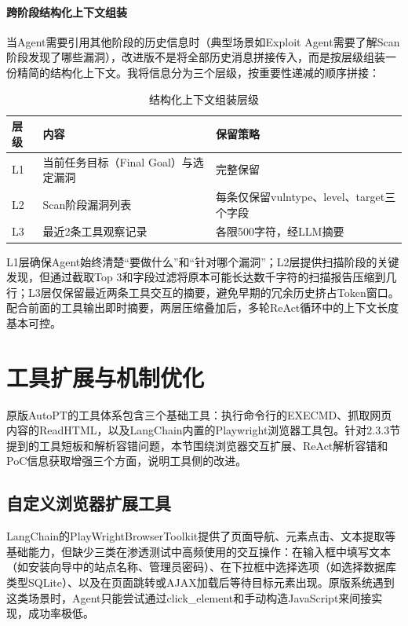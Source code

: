 \paragraph{跨阶段结构化上下文组装}

当Agent需要引用其他阶段的历史信息时（典型场景如Exploit Agent需要了解Scan阶段发现了哪些漏洞），改进版不是将全部历史消息拼接传入，而是按层级组装一份精简的结构化上下文。我将信息分为三个层级，按重要性递减的顺序拼接：

\begin{table}[htbp]
\centering
\caption{结构化上下文组装层级} \label{tab:ch3:2}
  \renewcommand{\arraystretch}{1.3}
\begin{tabular}{lll}
    \toprule
层级 & 内容 & 保留策略 \\
    \midrule
L1 & 当前任务目标（Final Goal）与选定漏洞 & 完整保留 \\
    \midrule
L2 & Scan阶段漏洞列表 & 每条仅保留vulntype、level、target三个字段 \\
    \midrule
L3 & 最近2条工具观察记录 & 各限500字符，经LLM摘要 \\
    \bottomrule
\end{tabular}
\end{table}

L1层确保Agent始终清楚“要做什么”和“针对哪个漏洞”；L2层提供扫描阶段的关键发现，但通过截取Top 3和字段过滤将原本可能长达数千字符的扫描报告压缩到几行；L3层仅保留最近两条工具交互的摘要，避免早期的冗余历史挤占Token窗口。配合前面的工具输出即时摘要，两层压缩叠加后，多轮ReAct循环中的上下文长度基本可控。

\section{工具扩展与机制优化}

原版AutoPT的工具体系包含三个基础工具：执行命令行的EXECMD、抓取网页内容的ReadHTML，以及LangChain内置的Playwright浏览器工具包。针对2.3.3节提到的工具短板和解析容错问题，本节围绕浏览器交互扩展、ReAct解析容错和PoC信息获取增强三个方面，说明工具侧的改进。

\subsection{自定义浏览器扩展工具}

LangChain的PlayWrightBrowserToolkit提供了页面导航、元素点击、文本提取等基础能力，但缺少三类在渗透测试中高频使用的交互操作：在输入框中填写文本（如安装向导中的站点名称、管理员密码）、在下拉框中选择选项（如选择数据库类型SQLite）、以及在页面跳转或AJAX加载后等待目标元素出现。原版系统遇到这类场景时，Agent只能尝试通过click\_element和手动构造JavaScript来间接实现，成功率极低。

